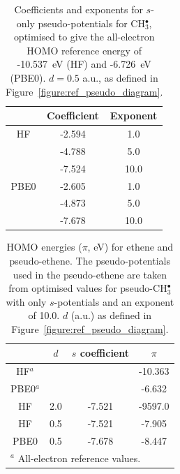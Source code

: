 \documentclass[12pt]{article}
\begin{document}

\begin{table}[ht]
\begin{tabular}{c c c}
\hline
 & Coefficient & Exponent \\ 
\hline
HF & -2.594 & 1.0 \\
 & -4.788 & 5.0 \\
 & -7.524 & 10.0 \\
\hline
PBE0 & -2.605 & 1.0 \\
 & -4.873 & 5.0 \\
 & -7.678 & 10.0 \\
\hline
\end{tabular}
\caption{Coefficients and exponents for \(s\)-only pseudo-potentials for CH\(^{\bullet}_{3}\), optimised to give 
the all-electron HOMO reference energy of  -10.537~eV (HF) and -6.726~eV (PBE0). 
\(d = 0.5\) a.u., as defined in Figure~\ref{figure:ref_pseudo_diagram}.}
\label{table:ch3_s_potentials}
\end{table}

\newpage

\begin{table}[ht]
\begin{tabular}{c c c c}
\hline
& $d$ & \(s\) coefficient & \( \pi \)  \\
\hline
HF$^a$   &     &        & -10.363 \\
PBE0$^a$ &     &        & -6.632 \\
HF       & 2.0 & -7.521 & -9597.0 \\
HF       & 0.5 & -7.521  & -7.905 \\
PBE0     & 0.5 &-7.678  & -8.447 \\
\hline
\multicolumn{4}{l}{$^a$ All-electron reference values.}\\
\end{tabular}
\caption{HOMO energies ($\pi$, eV) for ethene and pseudo-ethene. The pseudo-potentials used in the pseudo-ethene are taken from optimised values for 
pseudo-CH\(^{\bullet}_{3}\) with only \(s\)-potentials and an exponent of 10.0. $d$ (a.u.) as defined 
in Figure~\ref{figure:ref_pseudo_diagram}.}
\label{table:ethene_s_pseudo}
\end{table}
\end{document}
